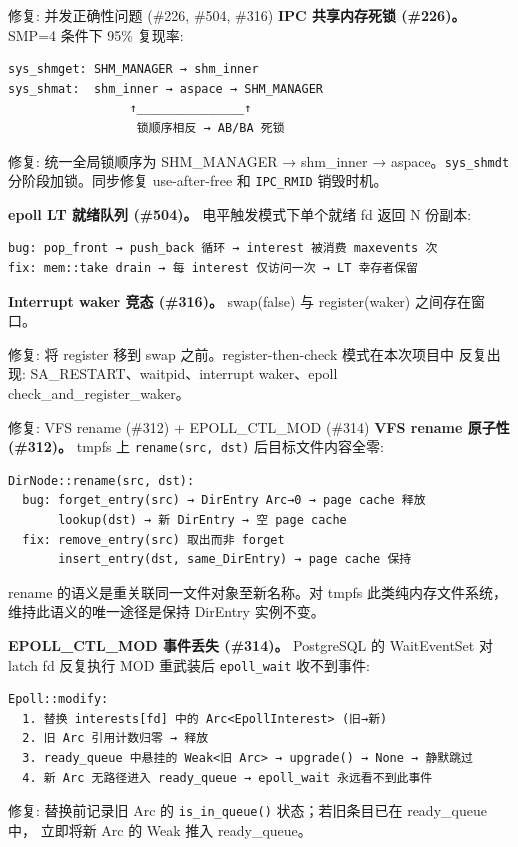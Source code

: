 \documentclass[aspectratio=169,10pt]{ctexbeamer}
\newcommand{\syscall}[1]{\texttt{#1}}
\newcommand{\code}[1]{\texttt{#1}}
\newcommand{\highlight}[1]{\textcolor{accent}{#1}}
\begin{document}
\begin{frame}[fragile,shrink=40]{修复: 并发正确性问题 (\#226, \#504, \#316)}
\textbf{IPC 共享内存死锁 (\#226)。} SMP=4 条件下 95\% 复现率:

\begin{verbatim}
sys_shmget: SHM_MANAGER → shm_inner
sys_shmat:  shm_inner → aspace → SHM_MANAGER
                 ↑_______________↑
                  锁顺序相反 → AB/BA 死锁
\end{verbatim}

修复: 统一全局锁顺序为 SHM\_MANAGER → shm\_inner → aspace。\texttt{sys\_shmdt}
分阶段加锁。同步修复 use-after-free 和 \texttt{IPC\_RMID} 销毁时机。

\vspace{1mm}
\textbf{epoll LT 就绪队列 (\#504)。} 电平触发模式下单个就绪 fd 返回 N 份副本:

\begin{verbatim}
bug: pop_front → push_back 循环 → interest 被消费 maxevents 次
fix: mem::take drain → 每 interest 仅访问一次 → LT 幸存者保留
\end{verbatim}

\vspace{1mm}
\textbf{Interrupt waker 竞态 (\#316)。} swap(false) 与 register(waker) 之间存在窗口。

修复: 将 register 移到 swap 之前。\highlight{register-then-check} 模式在本次项目中
反复出现: SA\_RESTART、waitpid、interrupt waker、epoll check\_and\_register\_waker。
\end{frame}


\begin{frame}[fragile,shrink=15]{修复: VFS rename (\#312) + EPOLL\_CTL\_MOD (\#314)}
\textbf{VFS rename 原子性 (\#312)。} tmpfs 上 \syscall{rename(src, dst)} 后目标文件内容全零:

\begin{verbatim}
DirNode::rename(src, dst):
  bug: forget_entry(src) → DirEntry Arc→0 → page cache 释放
       lookup(dst) → 新 DirEntry → 空 page cache
  fix: remove_entry(src) 取出而非 forget
       insert_entry(dst, same_DirEntry) → page cache 保持
\end{verbatim}

rename 的语义是重关联同一文件对象至新名称。对 tmpfs 此类纯内存文件系统，
维持此语义的唯一途径是保持 DirEntry 实例不变。

\vspace{1mm}
\textbf{EPOLL\_CTL\_MOD 事件丢失 (\#314)。} PostgreSQL 的 WaitEventSet 对 latch fd
反复执行 MOD 重武装后 \syscall{epoll_wait} 收不到事件:

\begin{verbatim}
Epoll::modify:
  1. 替换 interests[fd] 中的 Arc<EpollInterest> (旧→新)
  2. 旧 Arc 引用计数归零 → 释放
  3. ready_queue 中悬挂的 Weak<旧 Arc> → upgrade() → None → 静默跳过
  4. 新 Arc 无路径进入 ready_queue → epoll_wait 永远看不到此事件
\end{verbatim}

修复: 替换前记录旧 Arc 的 \code{is_in_queue()} 状态；若旧条目已在 ready\_queue 中，
立即将新 Arc 的 Weak 推入 ready\_queue。
\end{frame}
\end{document}
